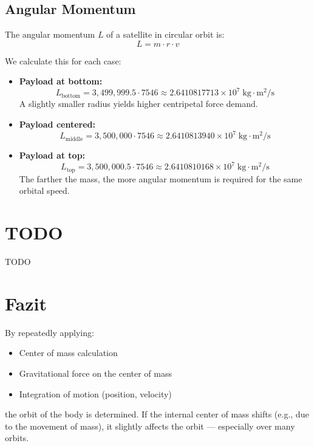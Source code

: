 \documentclass[conference]{IEEEtran}
\begin{document}
\subsection{Angular Momentum}
The angular momentum $L$ of a satellite in circular orbit is:
\[
L = m \cdot r \cdot v
\]

We calculate this for each case:

\begin{itemize}
  \item \textbf{Payload at bottom:}
  \[
  L_\text{bottom} = 3,499,999.5 \cdot 7546 \approx 2.6410817713 \times 10^7 \; \text{kg} \cdot \text{m}^2/\text{s}
  \]
  A slightly smaller radius yields higher centripetal force demand.

  \item \textbf{Payload centered:}
  \[
  L_\text{middle} = 3,500,000 \cdot 7546 \approx 2.6410813940 \times 10^7 \; \text{kg} \cdot \text{m}^2/\text{s}
  \]

  \item \textbf{Payload at top:}
  \[
  L_\text{top} = 3,500,000.5 \cdot 7546 \approx 2.6410810168 \times 10^7 \; \text{kg} \cdot \text{m}^2/\text{s}
  \]
  The farther the mass, the more angular momentum is required for the same orbital speed.
\end{itemize}

\section{TODO}
TODO

\section{Fazit}

By repeatedly applying:
\begin{itemize}
  \item Center of mass calculation
  \item Gravitational force on the center of mass
  \item Integration of motion (position, velocity)
\end{itemize}
the orbit of the body is determined. If the internal center of mass shifts (e.g., due to the movement of mass), it slightly affects the orbit — especially over many orbits.
\end{document}
